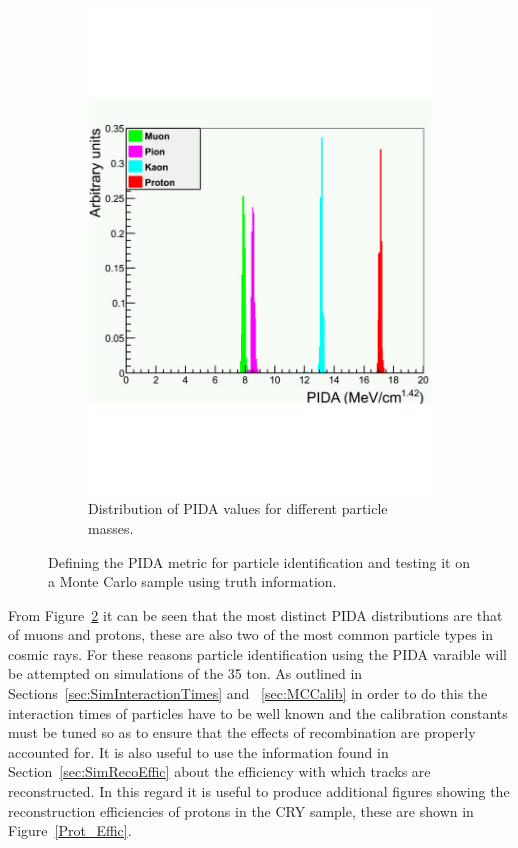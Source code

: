 \begin{figure}[h!]
\begin{subfigure}{0.45\textwidth}
    \includegraphics[width=\textwidth]{TruthPIDA}
    \caption{Distribution of PIDA values for different particle masses.}
    \label{fig:PIDA_MC}
  \end{subfigure}
  \caption[Defining the PIDA metric for particle identification.]
          {Defining the PIDA metric for particle identification and testing it on a Monte Carlo sample using truth information.}
          \label{fig:PIDAPlots}
\end{figure}

From Figure~\ref{fig:PIDAPlots} it can be seen that the most distinct PIDA distributions are that of muons and protons, these are also two of the most common particle types in cosmic rays. For these reasons particle identification using the PIDA varaible will be attempted on simulations of the 35 ton. As outlined in Sections~\ref{sec:SimInteractionTimes} and ~\ref{sec:MCCalib} in order to do this the interaction times of particles have to be well known and the calibration constants must be tuned so as to ensure that the effects of recombination are properly accounted for. It is also useful to use the information found in Section~\ref{sec:SimRecoEffic} about the efficiency with which tracks are reconstructed. In this regard it is useful to produce additional figures showing the reconstruction efficiencies of protons in the CRY sample, these are shown in Figure~\ref{Prot_Effic}.\\

